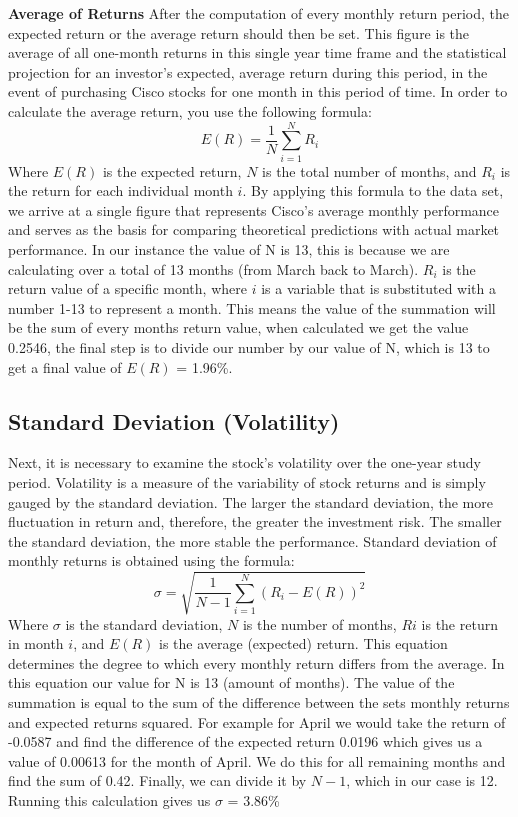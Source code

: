 \documentclass[12]{amsart}
\begin{document}
\begin{flushleft}
\begin{flushleft}
\textbf{Average of Returns}
After the computation of every monthly return period, the expected return or the average return should then be set. This figure is the average of all one-month returns in this single year time frame and the statistical projection for an investor's expected, average return during this period, in the event of purchasing Cisco stocks for one month in this period of time. In order to calculate the average return, you use the following formula:
\[
E(R) = \frac{1}{N} \sum_{i=1}^{N} R_i
\]
\bigbreak
Where $E(R)$ is the expected return, $N$ is the total number of months, and $R_i$ is the return for each individual month $i$. By applying this formula to the data set, we arrive at a single figure that represents Cisco's average monthly performance and serves as the basis for comparing theoretical predictions with actual market performance. In our instance the value of N is 13, this is because we are calculating over a total of 13 months (from March back to March). $R_i$ is the return value of a specific month, where $i$ is a variable that is substituted with a number 1-13 to represent a month. This means the value of the summation will be the sum of every months return value, when calculated we get the value 0.2546, the final step is to divide our number by our value of N, which is 13 to get a final value of $E(R)$ = 1.96\%.


\subsection*{Standard Deviation (Volatility)}
Next, it is necessary to examine the stock's volatility over the one-year study period. Volatility is a measure of the variability of stock returns and is simply gauged by the standard deviation. The larger the standard deviation, the more fluctuation in return and, therefore, the greater the investment risk. The smaller the standard deviation, the more stable the performance. Standard deviation of monthly returns is obtained using the formula:
\break
\[
\sigma = \sqrt{\frac{1}{N-1} \sum_{i=1}^{N} (R_i - E(R))^2}
\]
\bigbreak
Where $\sigma$ is the standard deviation, $N$ is the number of months, $Ri$ is the return in month $i$, and $E(R)$ is the average (expected) return. This equation determines the degree to which every monthly return differs from the average. In this equation our value for N is 13 (amount of months). The value of the summation is equal to the sum of the difference between the sets monthly returns and expected returns squared. For example for April we would take the return of -0.0587 and find the difference of the expected return 0.0196 which gives us a value of 0.00613 for the month of April. We do this for all remaining months and find the sum of 0.42. Finally, we can divide it by $N-1$, which in our case is 12. Running this calculation gives us $\sigma$ = 3.86\%


\end{flushleft}
\end{flushleft}
\end{document}
